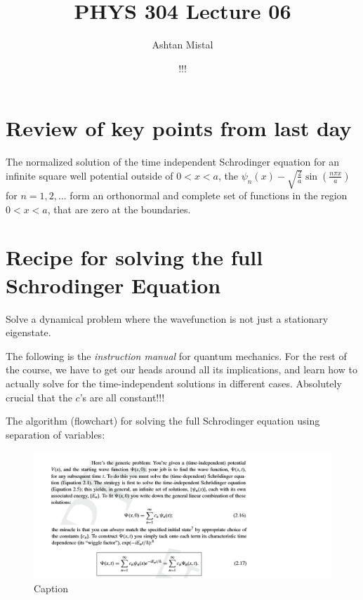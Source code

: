 \documentclass{article}
\title{PHYS 304 Lecture 06}
\author{Ashtan Mistal}
\date{!!!}
\begin{document}
\ifstandalone
\maketitle
\fi

\graphicspath{{./Lecture06/}}


\section{Review of key points from last day}

The normalized solution of the time independent Schrodinger equation for an infinite square well potential outside of $0 < x < a$, the $\psi_n(x) - \sqrt{\frac{2}{a}} \sin \left( \frac{n \pi x}{a} \right)$ for $n = 1,2,...$ form an orthonormal and complete set of functions in the region $0 < x < a$, that are zero at the boundaries. 

\section{Recipe for solving the full Schrodinger Equation}

Solve a dynamical problem where the wavefunction is not just a stationary eigenstate. 

The following is the \textit{instruction manual} for quantum mechanics. For the rest of the course, we have to get our heads around all its implications, and learn how to actually solve for the time-independent solutions in different cases. Absolutely crucial that the $c$’s are all constant!!!

The algorithm (flowchart) for solving the full Schrodinger equation using separation of variables:


\begin{figure}[h]
    \centering
    \includegraphics[width =  \textwidth]{Lecture06/1.png}
    \caption{Caption}
    \label{fig:my_label}
\end{figure}
\end{document}
